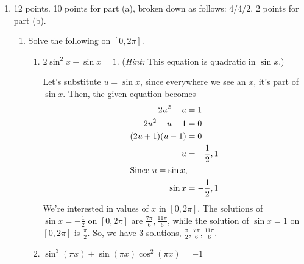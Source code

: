\documentclass{article}
\begin{document}
\begin{enumerate}
\item 

  \begin{grading}
12 points. 10 points for part (a), broken down as follows: 4/4/2. 2 points for part (b).
\end{grading}

\begin{enumerate}
  \item


Solve the following on $[0, 2\pi]$. 
    \begin{enumerate}
    \item
\begin{problem}[\vfill]
        $2 \sin^2 x - \sin x = 1$.  (\emph{Hint:} This equation is
        quadratic in $\sin x$.)
      \end{problem}

      \begin{solution}
        Let's substitute $u = \sin x$, since everywhere we see an $x$,
        it's part of $\sin x$.  Then, the given equation becomes
        \begin{align*}
          2 u^2 - u &= 1 \\
          2u^2 - u - 1 &= 0 \\
          (2u + 1)(u - 1) &= 0 \\
          u &= - \frac{1}{2}, 1 \\
          \shortintertext{Since $u = \sin x$,}
          \sin x &= - \frac{1}{2}, 1 
        \end{align*}
        We're interested in values of $x$ in $[0, 2\pi]$.  The
        solutions of $\sin x = - \frac{1}{2}$ on $[0, 2\pi]$ are $\frac{7 \pi}{6}, \frac{11\pi}{6}$, while the solution of $\sin x = 1$ on $[0, 2\pi]$
        is $\frac{\pi}{2}$.  So, we have 3
        solutions, $\boxed{\frac{\pi}{2}, \frac{7 \pi}{6}, \frac{11\pi}{6}}$.
      \end{solution}

    \item
      \begin{problem}[\vfill]
        $\displaystyle \sin^3(\pi x) + \sin(\pi x) \cos^2(\pi x) = -1$
      \end{problem}


\end{enumerate}
\end{enumerate}
\end{enumerate}
\end{document}
